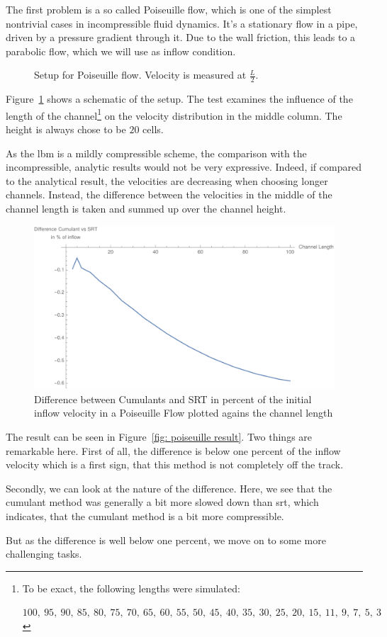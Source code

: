The first problem is a so called Poiseuille flow, which is one of the simplest nontrivial cases in incompressible fluid dynamics.
It's a stationary flow in a pipe, driven by a pressure gradient through it.
Due to the wall friction, this leads to a parabolic flow, which we will use as inflow condition.

\begin{figure}
  \centering
  
  \caption{Setup for Poiseuille flow. Velocity is measured at $\frac{L}{2}$.}
\label{fig: poiseuille}
\end{figure}

Figure~\ref{fig: poiseuille} shows a schematic of the setup.
The test examines the influence of the length of the channel\footnote{To be exact, the following lengths were simulated:\par
 $100,\ 95,\ 90,\ 85,\ 80,\ 75,\ 70,\ 65,\ 60,\ 55,\ 50,\ 45,\ 40,\ 35,\ 30,\ 25,\ 20,\ 15,\ 11,\ 9,\ 7,\ 5,\ 3$
} on the velocity distribution in the middle column.
The height is always chose to be $20$ cells.

As the \gls{lbm} is a mildly compressible scheme, the comparison with the incompressible, analytic results would not be very expressive.
Indeed, if compared to the analytical result, the velocities are decreasing when choosing longer channels.
Instead, the difference between the velocities in the middle of the channel length is taken and summed up over the channel height.

\begin{figure}
  \centering
  \includegraphics[width=0.8\linewidth]{../figures/poiseuille.pdf} %
  \caption{Difference between Cumulants and SRT in percent of the initial inflow velocity in a Poiseuille Flow plotted agains the channel length}
\label{fig: poiseuille result}
\end{figure}

The result can be seen in Figure~\eqref{fig: poiseuille result}.
Two things are remarkable here.
First of all, the difference is below one percent of the inflow velocity which is a first sign, that this method is not completely off the track.

Secondly, we can look at the nature of the difference.
Here, we see that the cumulant method was generally a bit more slowed down than \gls{srt}, which indicates, that the cumulant method is a bit more compressible.

But as the difference is well below one percent, we move on to some more challenging tasks.
